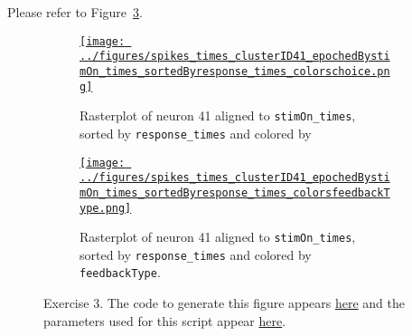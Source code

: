 \documentclass{article}
\begin{document}
Please refer to Figure~\ref{fig:ex3}.

\begin{figure}
    \begin{center}

        \begin{subfigure}{1.0\textwidth}
            \centering
            \href{https://www.gatsby.ucl.ac.uk/~rapela/neuroinformatics/2023/ws1/figures/spikes_times_clusterID41_epochedBystimOn_times_sortedByresponse_times_colorschoice.html}{\texttt{[image: ../figures/spikes\_times\_clusterID41\_epochedBystimOn\_times\_sortedByresponse\_times\_colorschoice.png]}}

            \caption{Rasterplot of neuron 41 aligned to
            \texttt{stimOn\_times},
            sorted by
            \texttt{response\_times}
            and colored by
            }

            \label{fig:ex3_1}
        \end{subfigure}

        \begin{subfigure}{1.0\textwidth}
            \centering
            \href{https://www.gatsby.ucl.ac.uk/~rapela/neuroinformatics/2023/ws1/figures/spikes_times_clusterID41_epochedBystimOn_times_sortedByresponse_times_colorsfeedbackType.html}{\texttt{[image: ../figures/spikes\_times\_clusterID41\_epochedBystimOn\_times\_sortedByresponse\_times\_colorsfeedbackType.png]}}

            \caption{Rasterplot of neuron 41 aligned to
            \texttt{stimOn\_times},
            sorted by
            \texttt{response\_times}
            and colored by
            \texttt{feedbackType}.
            }

            \label{fig:ex3_2}
        \end{subfigure}

        \caption{Exercise 3. The code to generate this figure appears
        \href{https://github.com/joacorapela/neuroinformatics23/blob/master/worksheets/ws1/mySolution/code/scripts/doPlotEpochedSpikesTimes.py}{here}
        and the parameters used for this script appear
        \href{https://github.com/joacorapela/neuroinformatics23/blob/master/worksheets/ws1/mySolution/code/scripts/doPlotEpochedSpikesTimes.csh}{here}.
        }

        \label{fig:ex3}


    \end{center}
\end{figure}
\end{document}
